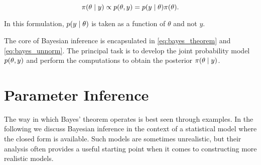 \begin{equation}\label{eq:bayes_unnorm}
    \pi \qty(\theta \mid y) \propto p(\theta, y) =  p \qty(y \mid \theta) \pi \qty(\theta) .
\end{equation}

In this formulation, $p \qty(y \mid \theta)$ is taken as a function of $\theta$ and not $y$.  

The core of Bayesian inference is encapsulated in \autoref{eq:bayes_theorem} and \autoref{eq:bayes_unnorm}. The principal task is to develop the joint probability model $p(\theta, y)$ and perform the computations to obtain the posterior $\pi \qty(\theta \mid y)$.






\section{Parameter Inference}\label{sec:param_inference}

The way in which Bayes' theorem operates is best seen through examples. In the following we discuss Bayesian inference in the context of a statistical model where the closed form is available. Such models are sometimes unrealistic, but their analysis often provides a useful starting point when it comes to constructing more realistic models.  

